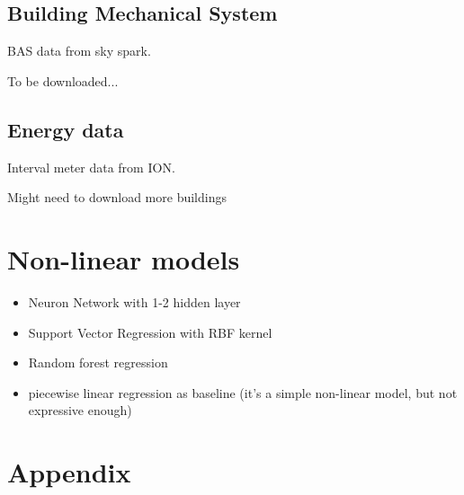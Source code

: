 \documentclass[12pt]{article}
\begin{document}
\subsection{Building Mechanical System}
BAS data from sky spark.

To be downloaded...
\subsection{Energy data}
Interval meter data from ION.

Might need to download more buildings
\section{Non-linear models}
\begin{itemize}
\item Neuron Network with 1-2 hidden layer
\item Support Vector Regression with RBF kernel
\item Random forest regression~\cite{randomForestWiki2016}
\item piecewise linear regression as baseline (it's a simple non-linear model, but not expressive enough)
\end{itemize}
\section{Appendix}
\end{document}
